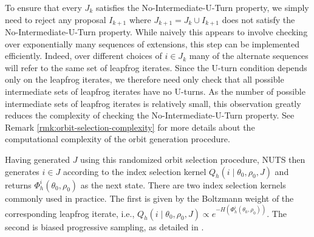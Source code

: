 \documentclass[letterpaper,11pt]{article}
\theoremstyle{plain}%
\theoremstyle{remark}
\begin{document}
To ensure that every $J_k$ satisfies the No-Intermediate-U-Turn property, we simply need to reject any proposal $I_{k+1}$ where $J_{k+1} = J_k \cup I_{k+1}$ does not satisfy the No-Intermediate-U-Turn property. While naively this appears to involve checking over exponentially many sequences of extensions, this step can be implemented efficiently. Indeed, over different choices of $i \in J_k$ many of the alternate sequences will refer to the same set of leapfrog iterates. Since the U-turn condition depends only on the leapfrog iterates, we therefore need only check that all possible intermediate sets of leapfrog iterates have no U-turns. As the number of possible intermediate sets of leapfrog iterates is relatively small, this observation greatly reduces the complexity of checking the No-Intermediate-U-Turn property. See Remark \ref{rmk:orbit-selection-complexity} for more details about the computational complexity of the orbit generation procedure.

Having generated $J$ using this randomized orbit selection procedure, NUTS then generates $i \in J$ according to the index selection kernel $Q_h(i \mid \theta_0, \rho_0, J)$ and returns $\Phi_h^i(\theta_0, \rho_0)$ as the next state. %
There are two index selection kernels commonly used in practice. The first is given by the Boltzmann weight of the corresponding leapfrog iterate, i.e., $Q_h(i \mid \theta_0, \rho_0, J) \propto e^{-H(\Phi_h^i(\theta_0, \rho_0))} $. The second is biased progressive sampling, as detailed in \cite{betancourt2017conceptual}. 
\end{document}
